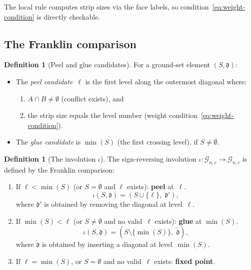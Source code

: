 \documentclass[11pt]{article}
\theoremstyle{plain}
\theoremstyle{definition}
\newtheorem{definition}[theorem]{Definition}
\begin{document}
The local rule computes strip sizes via the face labels,
so condition~\eqref{eq:weight-condition} is directly
checkable.


\subsection{The Franklin comparison}

\begin{definition}[Peel and glue candidates]
\label{def:candidates}
For a ground-set element $(S, \mathfrak{d})$:
\begin{itemize}
  \item The \emph{peel candidate}~$\ell$ is the first
    level along the outermost diagonal where:
    \begin{enumerate}
      \item $A \cap B \neq \emptyset$ (conflict exists),
        and
      \item the strip size equals the level number
        (weight condition~\eqref{eq:weight-condition}).
    \end{enumerate}
  \item The \emph{glue candidate} is $\min(S)$ (the
    first crossing level), if $S \neq \emptyset$.
\end{itemize}
\end{definition}

\begin{definition}[The involution $\iota$]
\label{def:involution}
The sign-reversing involution
$\iota \colon \mathcal{G}_{n,c} \to \mathcal{G}_{n,c}$
is defined by the Franklin comparison:
\begin{enumerate}
  \item If $\ell < \min(S)$ \textup{(}or $S = \emptyset$
    and $\ell$ exists\textup{)}: \textbf{peel} at~$\ell$.
    \[
      \iota(S, \mathfrak{d})
      = (S \cup \{\ell\},\; \mathfrak{d}'),
    \]
    where $\mathfrak{d}'$ is obtained by removing the
    diagonal at level~$\ell$.
  \item If $\min(S) < \ell$ \textup{(}or $S \neq \emptyset$
    and no valid~$\ell$ exists\textup{)}: \textbf{glue}
    at $\min(S)$.
    \[
      \iota(S, \mathfrak{d})
      = (S \setminus \{\min(S)\},\; \tilde{\mathfrak{d}}),
    \]
    where $\tilde{\mathfrak{d}}$ is obtained by inserting
    a diagonal at level~$\min(S)$.
  \item If $\ell = \min(S)$, or $S = \emptyset$ and no
    valid~$\ell$ exists: \textbf{fixed point}.
\end{enumerate}
\end{definition}
\end{document}
